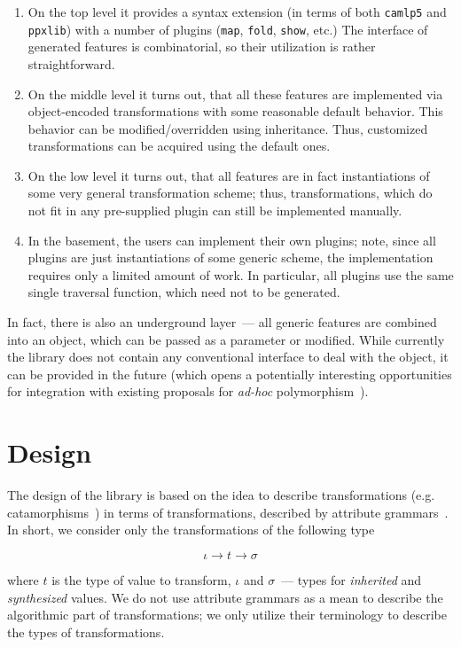 \documentclass[twocolumn,8pt]{extarticle}
\newcommand{\cd}[1]{\texttt{#1}}
\begin{document}
\begin{enumerate}
\item On the top level it provides a syntax extension (in terms of both \cd{camlp5} and \cd{ppxlib}) with a number of plugins
(\cd{map}, \cd{fold}, \cd{show}, etc.) The interface of generated features is combinatorial, so their utilization is rather straightforward.
  
\item On the middle level it turns out, that all these features are implemented via object-encoded transformations with some reasonable
default behavior. This behavior can be modified/overridden using inheritance. Thus, customized transformations can be acquired using
the default ones.

\item On the low level it turns out, that all features are in fact instantiations of some very general transformation scheme; thus, transformations,
which do not fit in any pre-supplied plugin can still be implemented manually.
  
\item In the basement, the users can implement their own plugins; note, since all plugins are just instantiations of some generic scheme, the implementation
requires only a limited amount of work. In particular, all plugins use the same single traversal function, which need not to be generated.
\end{enumerate}

In fact, there is also an underground layer~--- all generic features are combined into an object, which can be passed as a parameter or modified. While
currently the library does not contain any conventional interface to deal with the object, it can be provided in the future (which opens a potentially
interesting opportunities for integration with existing proposals for \emph{ad-hoc} polymorphism~\cite{ModularImplicits}).

\section{Design}

The design of the library is based on the idea to describe transformations (e.g. catamorphisms~\cite{Bananas}) in terms of transformations, described by
attribute grammars~\cite{AGKnuth,AGSwierstra}. In short, we consider only the transformations of the following type

\[
\iota \to t \to \sigma
\]

where $t$ is the type of value to transform, $\iota$ and $\sigma$~--- types for \emph{inherited} and \emph{synthesized} values. We do not use attribute
grammars as a mean to describe the algorithmic part of transformations; we only utilize their terminology to describe the types of transformations.
\end{document}
